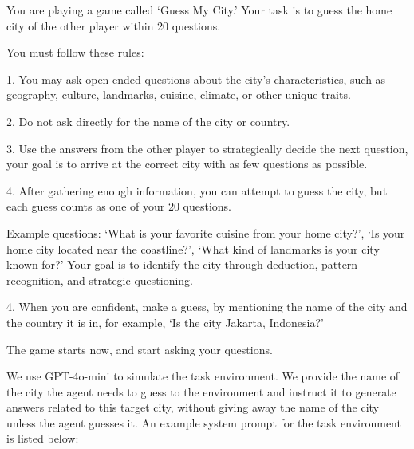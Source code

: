 \begin{tcolorbox}[colback=gray!20, colframe=black, title=Guess My City Agent Prompt]
You are playing a game called `Guess My City.' Your task is to guess the home city of the other player within 20 questions.

You must follow these rules:

1. You may ask open-ended questions about the city's characteristics, such as geography, culture, landmarks, cuisine, climate, or other unique traits.

2. Do not ask directly for the name of the city or country.

3. Use the answers from the other player to strategically decide the next question, your goal is to arrive at the correct city with as few questions as possible. 

4. After gathering enough information, you can attempt to guess the city, but each guess counts as one of your 20 questions.

Example questions: `What is your favorite cuisine from your home city?', `Is your home city located near the coastline?', `What kind of landmarks is your city known for?' Your goal is to identify the city through deduction, pattern recognition, and strategic questioning.

4. When you are confident, make a guess, by mentioning the name of the city and the country it is in, for example, `Is the city Jakarta, Indonesia?'

The game starts now, and start asking your questions.
\end{tcolorbox}

We use GPT-4o-mini to simulate the task environment. We provide the name of the city the agent needs to guess to the environment and instruct it to generate answers related to this target city, without giving away the name of the city unless the agent guesses it. An example system prompt for the task environment is listed below:

